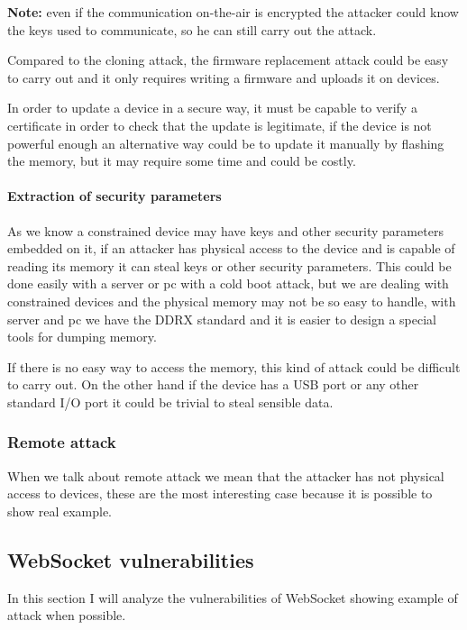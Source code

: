 	\textbf{Note:} even if the communication on-the-air is encrypted the attacker could know the keys used to communicate, so he can still carry out the attack.\newline
	
	Compared to the cloning attack, the firmware replacement attack could be easy to carry out and it only requires writing a firmware and uploads it on devices.\newline
	
	In order to update a device in a secure way, it must be capable to verify a certificate in order to check that the update is legitimate, if the device is not powerful enough an alternative way could be to update it manually by flashing the memory, but it may require some time and could be costly.\newline
	
	\paragraph{Extraction of security parameters}
	As we know a constrained device may have keys and other security parameters embedded on it, if an attacker has physical access to the device and is capable of reading its memory it can steal keys or other security parameters.\newline
	This could be done easily with a server or pc with a cold boot attack, but we are dealing with constrained devices and the physical memory may not be so easy to handle, with server and pc we have the DDRX standard and it is easier to design a special tools for dumping memory.\newline
	
	If there is no easy way to access the memory, this kind of attack could be difficult to carry out.
	On the other hand if the device has a USB port or any other standard I/O port it could be trivial to steal sensible data.
	
	
	\subsubsection{Remote attack}
	When we talk about remote attack we mean that the attacker has not physical access to devices, these are the most interesting case because it is possible to show real example.
	
	
	\subsection{WebSocket vulnerabilities}
	In this section I will analyze the vulnerabilities of WebSocket showing example of attack when possible.
	
